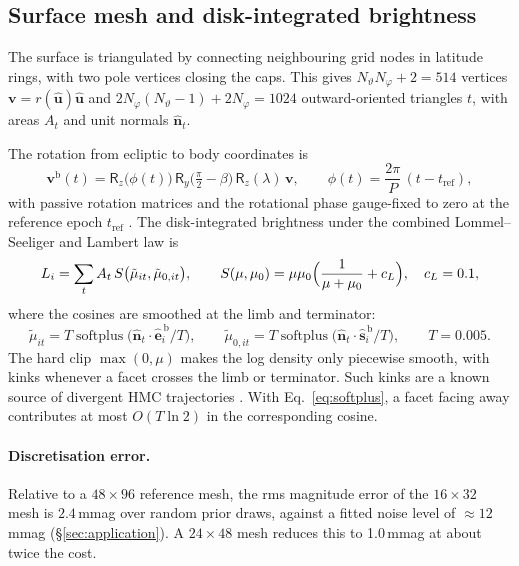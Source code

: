 \documentclass[11pt,a4paper]{article}
\theoremstyle{remark}
\newcommand{\vect}[1]{\bm{#1}}
\newcommand{\uv}[1]{\hat{\bm{#1}}}
\DeclareMathOperator{\softplus}{softplus}
\begin{document}
\subsection{Surface mesh and disk-integrated brightness}
\label{sec:brightness}
The surface is triangulated by connecting neighbouring grid nodes in latitude rings, with two pole
vertices closing the caps. This gives $N_\vartheta N_\varphi+2=514$ vertices $\vect v=r(\uv u)\uv u$ and
$2N_\varphi(N_\vartheta-1)+2N_\varphi=1024$ outward-oriented triangles $t$, with areas $A_t$ and unit
normals $\uv n_t$.

The rotation from ecliptic to body coordinates is
\begin{equation}
  \vect v^{\mathrm b}(t)=\mathsf R_z\bigl(\phi(t)\bigr)\,\mathsf R_y\bigl(\tfrac\pi2-\beta\bigr)\,\mathsf R_z(\lambda)\,\vect v,\qquad
  \phi(t)=\frac{2\pi}{P}\,(t-t_{\mathrm{ref}}),
\end{equation}
with passive rotation matrices and the rotational phase gauge-fixed to zero at the reference epoch
$t_{\mathrm{ref}}$ \citep{lcinv_convex2026}. The disk-integrated brightness under the combined
Lommel--Seeliger and Lambert law \citep{kaasalainen2001b} is
\begin{equation}
  L_i=\sum_tA_t\,S\bigl(\tilde\mu_{it},\tilde\mu_{0,it}\bigr),\qquad
  S(\mu,\mu_0)=\mu\mu_0\Bigl(\frac{1}{\mu+\mu_0}+c_L\Bigr),\quad c_L=0.1,
  \label{eq:brightness}
\end{equation}
where the cosines are smoothed at the limb and terminator:
\begin{equation}
  \tilde\mu_{it}=T\softplus\!\bigl(\uv n_t\cdot\uv e_i^{\,\mathrm b}/T\bigr),\qquad
  \tilde\mu_{0,it}=T\softplus\!\bigl(\uv n_t\cdot\uv s_i^{\,\mathrm b}/T\bigr),\qquad T=0.005 .
  \label{eq:softplus}
\end{equation}
The hard clip $\max(0,\mu)$ makes the log density only piecewise smooth, with kinks whenever a facet
crosses the limb or terminator. Such kinks are a known source of divergent HMC trajectories
\citep{betancourt2017}. With Eq.~\eqref{eq:softplus}, a facet facing away contributes at most
$O(T\ln2)$ in the corresponding cosine.

\paragraph{Discretisation error.} Relative to a $48\times96$ reference mesh, the rms magnitude error of
the $16\times32$ mesh is $2.4$\,mmag over random prior draws, against a fitted noise level of
$\approx12$\,mmag (\S\ref{sec:application}). A $24\times48$ mesh reduces this to 1.0\,mmag at about
twice the cost.
\end{document}
